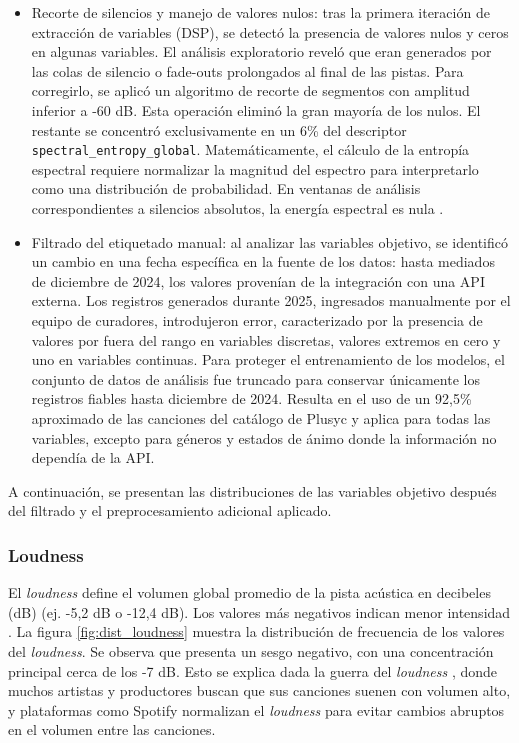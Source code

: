 \begin{itemize}
    \item Recorte de silencios y manejo de valores nulos: tras la primera iteración de extracción de variables (DSP), se detectó la presencia de valores nulos y ceros en algunas variables. El análisis exploratorio reveló que eran generados por las colas de silencio o fade-outs prolongados al final de las pistas. Para corregirlo, se aplicó un algoritmo de recorte de segmentos con amplitud inferior a -60 dB. Esta operación eliminó la gran mayoría de los nulos. El restante se concentró exclusivamente en un 6\% del descriptor \texttt{spectral\_entropy\_global}. Matemáticamente, el cálculo de la entropía espectral requiere normalizar la magnitud del espectro para interpretarlo como una distribución de probabilidad. En ventanas de análisis correspondientes a silencios absolutos, la energía espectral es nula \cite{lerch2012introduction}.
    \item Filtrado del etiquetado manual: al analizar las variables objetivo, se identificó un cambio en una fecha específica en la fuente de los datos: hasta mediados de diciembre de 2024, los valores provenían de la integración con una API externa. Los registros generados durante 2025, ingresados manualmente por el equipo de curadores, introdujeron error, caracterizado por la presencia de valores por fuera del rango en variables discretas, valores extremos en cero y uno en variables continuas. Para proteger el entrenamiento de los modelos, el conjunto de datos de análisis fue truncado para conservar únicamente los registros fiables hasta diciembre de 2024. Resulta en el uso de un 92{,}5\% aproximado de las canciones del catálogo de Plusyc y aplica para todas las variables, excepto para géneros y estados de ánimo donde la información no dependía de la API.
\end{itemize}

A continuación, se presentan las distribuciones de las variables objetivo después del filtrado y el preprocesamiento adicional aplicado.

\subsubsection{Loudness}
El \textit{loudness} define el volumen global promedio de la pista acústica en decibeles (dB) (ej. -5,2 dB o -12,4 dB). Los valores más negativos indican menor intensidad  \citep{spotify}.
La figura \ref{fig:dist_loudness} muestra la distribución de frecuencia de los valores del \textit{loudness}. Se observa que presenta un sesgo negativo, con una concentración principal cerca de los -7 dB. Esto se explica dada la guerra del \textit{loudness} \cite{vickers2010loudness}, donde muchos artistas y productores buscan que sus canciones suenen con volumen alto, y plataformas como Spotify normalizan el \textit{loudness} para evitar cambios abruptos en el volumen entre las canciones.

